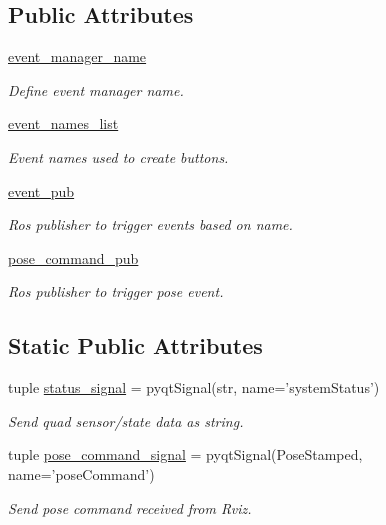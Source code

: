 \subsection*{Public Attributes}
\begin{DoxyCompactItemize}
\item 
\hyperlink{classaerial__autonomy_1_1ros__event__trigger_1_1RosEventTrigger_ac1ff7e7fa3e8ac610473fa8c1e547279}{event\-\_\-manager\-\_\-name}
\begin{DoxyCompactList}\small\item\em Define event manager name. \end{DoxyCompactList}\item 
\hyperlink{classaerial__autonomy_1_1ros__event__trigger_1_1RosEventTrigger_ac24af24de20107643a194072bd64dbd8}{event\-\_\-names\-\_\-list}
\begin{DoxyCompactList}\small\item\em Event names used to create buttons. \end{DoxyCompactList}\item 
\hyperlink{classaerial__autonomy_1_1ros__event__trigger_1_1RosEventTrigger_aa7e45c61e2f9407a82e1e03d83998e6e}{event\-\_\-pub}
\begin{DoxyCompactList}\small\item\em Ros publisher to trigger events based on name. \end{DoxyCompactList}\item 
\hyperlink{classaerial__autonomy_1_1ros__event__trigger_1_1RosEventTrigger_adc9a3f404db853ef8e2b5b988bdaaacb}{pose\-\_\-command\-\_\-pub}
\begin{DoxyCompactList}\small\item\em Ros publisher to trigger pose event. \end{DoxyCompactList}\end{DoxyCompactItemize}
\subsection*{Static Public Attributes}
\begin{DoxyCompactItemize}
\item 
tuple \hyperlink{classaerial__autonomy_1_1ros__event__trigger_1_1RosEventTrigger_ad2e6e150ea166d252a7a40982875fe27}{status\-\_\-signal} = pyqt\-Signal(str, name='system\-Status')
\begin{DoxyCompactList}\small\item\em Send quad sensor/state data as string. \end{DoxyCompactList}\item 
tuple \hyperlink{classaerial__autonomy_1_1ros__event__trigger_1_1RosEventTrigger_a9082897445ba520850cc7108aefe0d77}{pose\-\_\-command\-\_\-signal} = pyqt\-Signal(Pose\-Stamped, name='pose\-Command')
\begin{DoxyCompactList}\small\item\em Send pose command received from Rviz. \end{DoxyCompactList}\end{DoxyCompactItemize}


